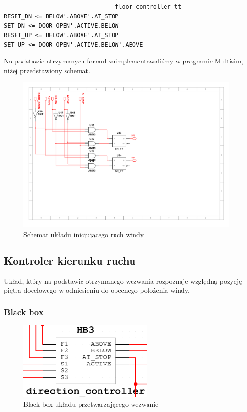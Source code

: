 \documentclass[a4paper]{article}
\begin{document}
\begin{verbatim}
--------------------------------floor_controller_tt
RESET_DN <= BELOW'.ABOVE'.AT_STOP
SET_DN <= DOOR_OPEN'.ACTIVE.BELOW
RESET_UP <= BELOW'.ABOVE'.AT_STOP
SET_UP <= DOOR_OPEN'.ACTIVE.BELOW'.ABOVE
\end{verbatim}

Na podstawie otrzymanych formuł zaimplementowaliśmy w programie Multisim,
niżej przedstawiony schemat.

\begin{figure}[H]
    \centering
    \includegraphics[width=\textwidth]{floor_controller_schemat.pdf}
    \caption{Schemat układu inicjującego ruch windy}
\end{figure}

\subsection{Kontroler kierunku ruchu}

Układ, który na podstawie otrzymanego wezwania rozpoznaje względną pozycję piętra docelowego
w odniesieniu do obecnego położenia windy.

\subsubsection{Black box}
\begin{figure}[H]
    \centering
    \includegraphics[width=0.6\textwidth]{direction_controller.png}
    \caption{Black box układu przetwarzającego wezwanie}
\end{figure}
\end{document}
